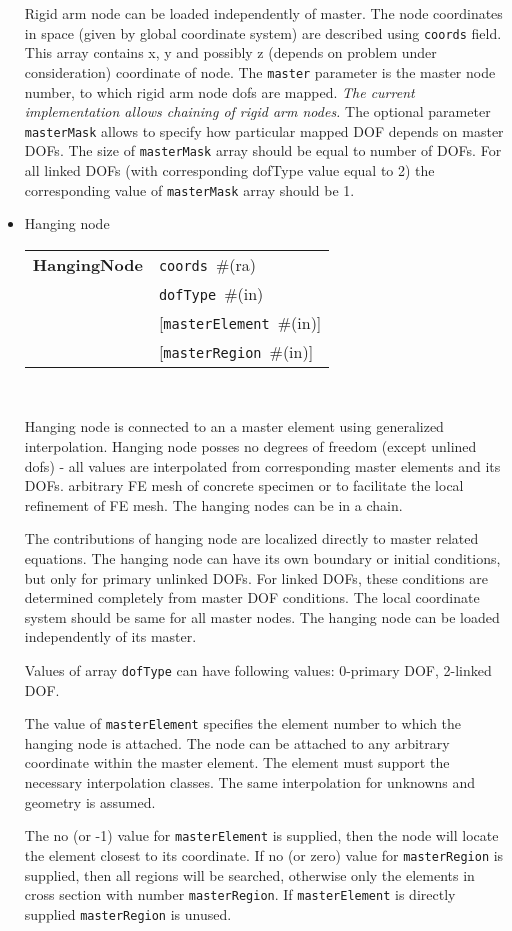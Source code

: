 \documentclass[a4paper]{article}
\newcommand{\param}[1]{\texttt{#1}} %
\newcommand{\optional}[1]{[#1]} %
\newcommand{\field}[2]{\param{#1}~\#{\tiny(#2)}} %
\newcommand{\optField}[2]{\optional{\field{#1}{#2}}}
\newcommand{\entKeywordInst}[1]{\textbf{#1}} %
\newenvironment{record}[1][]{\begin{tabular}{|ll}}{\end{tabular}\\}
\newcommand{\recentry}[2]{{#1}&{#2}\\}
\newcounter{rcc}
\newenvironment{record}[1][\textwidth]{\setcounter{rcc}{0}\rowcolors{1}{lightgray}{lightgray}\tabularx{#1}{llR} \hline}
               {\endtabularx}
\newcommand{\recentry}[2]{\ifthenelse{\value{rcc}>0}{$\backslash$ \\}{\setcounter{rcc}{1}}{#1}&{#2}&}
\begin{document}
\begin{itemize}
Rigid arm node can be loaded
independently of master. The node coordinates in space (given by
global coordinate system) are described using \param{coords}
field. This array contains x, y and possibly z (depends on problem
under consideration) coordinate of node. The \param{master} parameter is the
master node number, to which rigid arm node dofs are mapped.
{\em The current implementation allows chaining of rigid arm nodes.}
The optional parameter \param{masterMask} allows to specify how
particular mapped DOF depends on master DOFs. The size of \param{masterMask} array
should be equal to number of DOFs. For all linked DOFs (with
corresponding dofType value equal to 2) the corresponding value of
\param{masterMask} array should be 1.

\item Hanging node

\begin{record}[0.9\textwidth]
  \recentry{\entKeywordInst{HangingNode}}{\field{coords}{ra}}
  \recentry{}{\field{dofType}{in}}
  \recentry{}{\optField{masterElement}{in}}
  \recentry{}{\optField{masterRegion}{in}}
\end{record}

Hanging node is connected to an a master element using generalized interpolation.
Hanging node posses no degrees of freedom (except unlined dofs) - all values are
interpolated from corresponding master elements and its DOFs.
arbitrary FE mesh of concrete specimen or to facilitate the local
refinement of FE mesh. The hanging nodes can be in a chain.

The contributions of hanging node are localized directly to master related equations.
The hanging node can have its own boundary or initial conditions, but
only for primary unlinked DOFs. For linked DOFs, these conditions are
determined completely from master DOF conditions.
The local coordinate system should be same for all master nodes.
The hanging node can be loaded independently of its master.

Values of array \param{dofType} can have following values:
0-primary DOF, 2-linked DOF.

The value of \param{masterElement} specifies the element number to which the hanging node is attached.
The node can be attached to any arbitrary coordinate within the master element.
The element must support the necessary interpolation classes.
The same interpolation for unknowns and geometry is assumed.

The no (or -1) value for \param{masterElement} is supplied, then the node will locate the element closest to its coordinate.
If no (or zero) value for \param{masterRegion} is supplied, then all regions will be searched,
otherwise only the elements in cross section with number \param{masterRegion}.
If \param{masterElement} is directly supplied \param{masterRegion} is unused.


\end{itemize}
\end{document}
